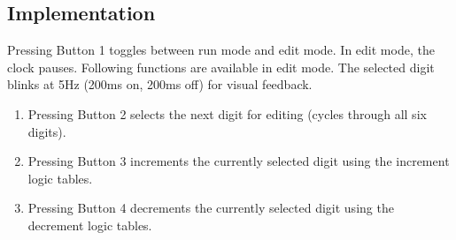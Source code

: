 \subsection{Implementation}
    Pressing Button 1 toggles between run mode and edit mode. In edit mode, the clock pauses.  Following functions are available in edit mode.
    The selected digit blinks at 5Hz (200ms on, 200ms off) for visual feedback.
\begin{enumerate}
    \item Pressing Button 2 selects the next digit for editing (cycles through all six digits).
    \item Pressing Button 3 increments the currently selected digit using the increment logic tables.
    \item Pressing Button 4 decrements the currently selected digit using the decrement logic tables.
\end{enumerate}
